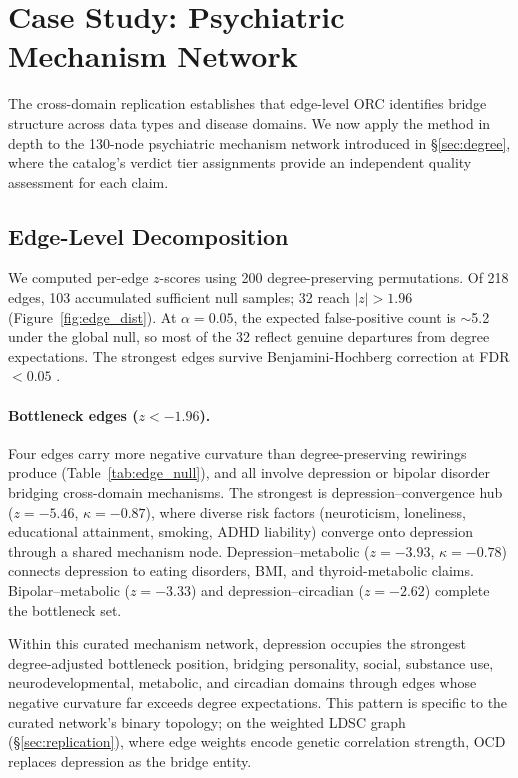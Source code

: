 \documentclass[11pt]{article}
\begin{document}
\section{Case Study: Psychiatric Mechanism Network}
\label{sec:casestudy}

The cross-domain replication establishes that edge-level ORC identifies bridge structure across data types and disease domains. We now apply the method in depth to the 130-node psychiatric mechanism network introduced in \S\ref{sec:degree}, where the catalog's verdict tier assignments provide an independent quality assessment for each claim.

\subsection{Edge-Level Decomposition}
\label{sec:edge}

We computed per-edge $z$-scores using 200 degree-preserving permutations. Of 218 edges, 103 accumulated sufficient null samples; 32 reach $|z| > 1.96$ (Figure~\ref{fig:edge_dist}). At $\alpha = 0.05$, the expected false-positive count is $\sim$5.2 under the global null, so most of the 32 reflect genuine departures from degree expectations. The strongest edges survive Benjamini-Hochberg correction at FDR $< 0.05$ \citep{benjamini1995controlling}.

\paragraph{Bottleneck edges ($z < -1.96$).} Four edges carry more negative curvature than degree-preserving rewirings produce (Table~\ref{tab:edge_null}), and all involve depression or bipolar disorder bridging cross-domain mechanisms. The strongest is depression--convergence hub ($z = -5.46$, $\kappa = -0.87$), where diverse risk factors (neuroticism, loneliness, educational attainment, smoking, ADHD liability) converge onto depression through a shared mechanism node. Depression--metabolic ($z = -3.93$, $\kappa = -0.78$) connects depression to eating disorders, BMI, and thyroid-metabolic claims. Bipolar--metabolic ($z = -3.33$) and depression--circadian ($z = -2.62$) complete the bottleneck set.

Within this curated mechanism network, depression occupies the strongest degree-adjusted bottleneck position, bridging personality, social, substance use, neurodevelopmental, metabolic, and circadian domains through edges whose negative curvature far exceeds degree expectations. This pattern is specific to the curated network's binary topology; on the weighted LDSC graph (\S\ref{sec:replication}), where edge weights encode genetic correlation strength, OCD replaces depression as the bridge entity.
\end{document}
